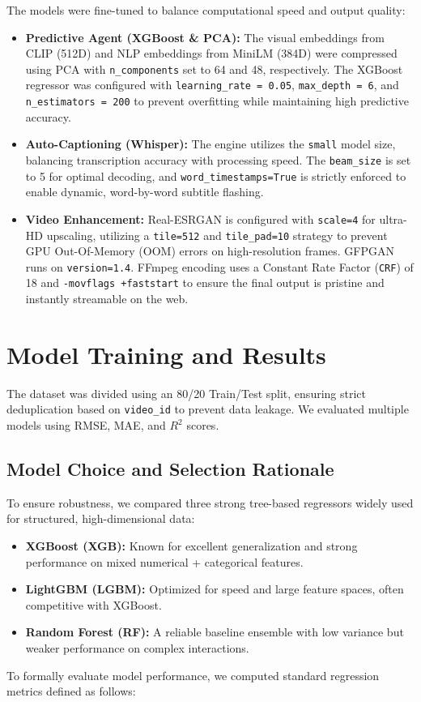 The models were fine-tuned to balance computational speed and output quality:

\begin{itemize}
    \item \textbf{Predictive Agent (XGBoost \& PCA):} The visual embeddings from CLIP (512D) and NLP embeddings from MiniLM (384D) were compressed using PCA with \texttt{n\_components} set to 64 and 48, respectively. The XGBoost regressor was configured with \texttt{learning\_rate = 0.05}, \texttt{max\_depth = 6}, and \texttt{n\_estimators = 200} to prevent overfitting while maintaining high predictive accuracy.
    \item \textbf{Auto-Captioning (Whisper):} The engine utilizes the \texttt{small} model size, balancing transcription accuracy with processing speed. The \texttt{beam\_size} is set to 5 for optimal decoding, and \texttt{word\_timestamps=True} is strictly enforced to enable dynamic, word-by-word subtitle flashing.
    \item \textbf{Video Enhancement:} Real-ESRGAN is configured with \texttt{scale=4} for ultra-HD upscaling, utilizing a \texttt{tile=512} and \texttt{tile\_pad=10} strategy to prevent GPU Out-Of-Memory (OOM) errors on high-resolution frames. GFPGAN runs on \texttt{version=1.4}. FFmpeg encoding uses a Constant Rate Factor (\texttt{CRF}) of 18 and \texttt{-movflags +faststart} to ensure the final output is pristine and instantly streamable on the web.
\end{itemize}
\section{Model Training and Results}

The dataset was divided using an 80/20 Train/Test split, ensuring strict deduplication based on \texttt{video\_id} to prevent data leakage. We evaluated multiple models using RMSE, MAE, and $R^2$ scores.

\subsection{Model Choice and Selection Rationale}
To ensure robustness, we compared three strong tree-based regressors widely used for structured, high-dimensional data:
\begin{itemize}
    \item \textbf{XGBoost (XGB):} Known for excellent generalization and strong performance on mixed numerical + categorical features.
    \item \textbf{LightGBM (LGBM):} Optimized for speed and large feature spaces, often competitive with XGBoost.
    \item \textbf{Random Forest (RF):} A reliable baseline ensemble with low variance but weaker performance on complex interactions.
\end{itemize}
To formally evaluate model performance, we computed standard regression metrics defined as follows:


